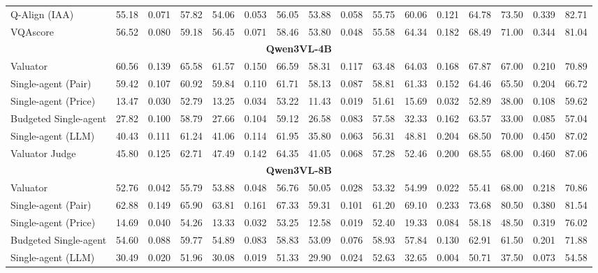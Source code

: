\begin{table}[!t]
{\begin{tabular}{lccccccccccccccc}
Q-Align (IAA)                & 55.18 & 0.071 & 57.82 & 54.06 & 0.053 & 56.05 & 53.88 & 0.058 & 55.75 & 60.06 & 0.121 & 64.78 & 73.50 & 0.339 & 82.71 \\
VQAscore                     & 56.52 & 0.080 & 59.18 & 56.45 & 0.071 & 58.46 & 53.80 & 0.048 & 55.58 & 64.34 & 0.182 & 68.49 & 71.00 & 0.344 & 81.04 \\
\midrule
\multicolumn{16}{c}{\textbf{Qwen3VL-4B}} \\
\midrule
Valuator                     & 60.56 & 0.139 & 65.58 & 61.57 & 0.150 & 66.59 & 58.31 & 0.117 & 63.48 & 64.03 & 0.168 & 67.87 & 67.00 & 0.210 & 70.89 \\
Single-agent (Pair)          & 59.42 & 0.107 & 60.92 & 59.84 & 0.110 & 61.71 & 58.13 & 0.087 & 58.81 & 61.33 & 0.152 & 64.46 & 65.50 & 0.204 & 66.72 \\
Single-agent (Price)         & 13.47 & 0.030 & 52.79 & 13.25 & 0.034 & 53.22 & 11.43 & 0.019 & 51.61 & 15.69 & 0.032 & 52.89 & 38.00 & 0.108 & 59.62 \\
Budgeted Single-agent        & 27.82 & 0.100 & 58.79 & 27.66 & 0.104 & 59.12 & 26.58 & 0.083 & 57.58 & 32.33 & 0.162 & 63.57 & 33.00 & 0.085 & 57.04 \\
Single-agent (LLM)           & 40.43 & 0.111 & 61.24 & 41.06 & 0.114 & 61.95 & 35.80 & 0.063 & 56.31 & 48.81 & 0.204 & 68.50 & 70.00 & 0.450 & 87.02 \\
Valuator Judge               & 45.80 & 0.125 & 62.71 & 47.49 & 0.142 & 64.35 & 41.05 & 0.068 & 57.28 & 52.46 & 0.200 & 68.55 & 68.00 & 0.460 & 87.06 \\
\midrule
\multicolumn{16}{c}{\textbf{Qwen3VL-8B}} \\
\midrule
Valuator                     & 52.76 & 0.042 & 55.79 & 53.88 & 0.048 & 56.76 & 50.05 & 0.028 & 53.32 & 54.99 & 0.022 & 55.41 & 68.00 & 0.218 & 70.86 \\
Single-agent (Pair)          & 62.88 & 0.149 & 65.90 & 63.81 & 0.161 & 67.33 & 59.31 & 0.101 & 61.20 & 69.10 & 0.233 & 73.68 & 80.50 & 0.380 & 81.54 \\
Single-agent (Price)         & 14.69 & 0.040 & 54.26 & 13.33 & 0.032 & 53.25 & 12.58 & 0.019 & 52.40 & 19.33 & 0.084 & 58.18 & 48.50 & 0.319 & 76.02 \\
Budgeted Single-agent        & 54.60 & 0.088 & 59.77 & 54.89 & 0.083 & 58.83 & 53.09 & 0.076 & 58.93 & 57.84 & 0.130 & 62.91 & 61.50 & 0.201 & 71.88 \\
Single-agent (LLM)           & 30.49 & 0.020 & 51.96 & 30.08 & 0.019 & 51.33 & 29.90 & 0.024 & 52.63 & 32.65 & 0.004 & 50.71 & 37.50 & 0.073 & 54.58 \\

\end{tabular}}
\end{table}
